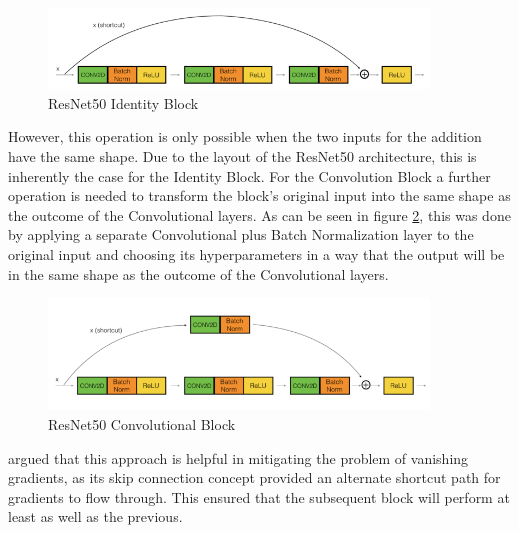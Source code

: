 \begin{figure}[H]
  \begin{center}
  \includegraphics[angle=0, width=0.9\textwidth]{Figures/ResNet50_IdentityBlock.png}
  \caption{ResNet50 Identity Block\citep{Dwivedi:2019:ResNetInKeras}}
  \label{fig:ResNet50IdentityBlock}
  \end{center}
\end{figure}

However, this operation is only possible when the two inputs for the addition have the same shape. Due to the layout of the ResNet50 architecture, this is inherently the case for the Identity Block. For the Convolution Block a further operation is needed to transform the block's original input into the same shape as the outcome of the Convolutional layers. As can be seen in figure \ref{fig:ResNet50ConvBlock}, this was done by applying a separate Convolutional plus Batch Normalization layer to the original input and choosing its hyperparameters in a way that the output will be in the same shape as the outcome of the Convolutional layers.

\begin{figure}[H]
  \begin{center}
  \includegraphics[angle=0, width=0.9\textwidth]{Figures/ResNet50_ConvBlock.png}
  \caption{ResNet50 Convolutional Block\citep{Dwivedi:2019:ResNetInKeras}}
  \label{fig:ResNet50ConvBlock}
  \end{center}
\end{figure}

\citet{Dwivedi:2019:ResNetInKeras} argued that this approach is helpful in mitigating the problem of vanishing gradients, as its skip connection concept provided an alternate shortcut path for gradients to flow through. This ensured that the subsequent block will perform at least as well as the previous.

